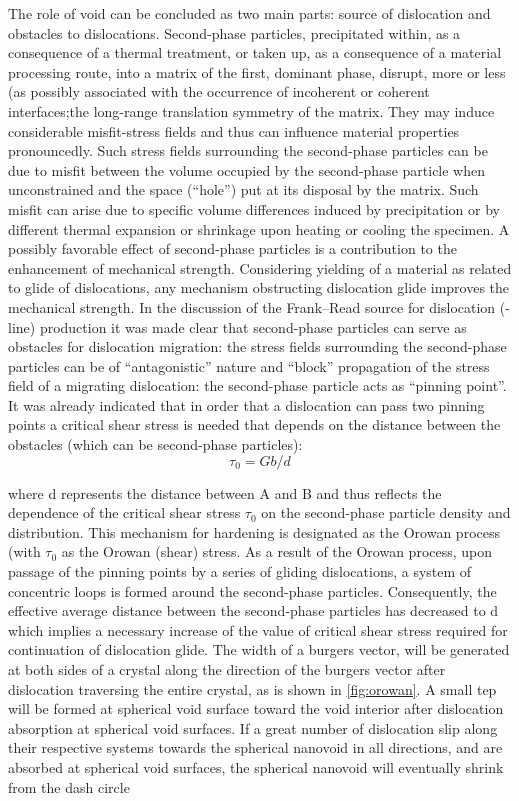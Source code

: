 \documentclass[metals,article,submit,moreauthors,pdftex,10pt,a4paper]{Definitions/mdpi}
\begin{document}
The role of void can be concluded as two main parts: source of dislocation and obstacles to dislocations.  Second-phase particles, precipitated within, as a consequence of a thermal treatment, or taken up, as a consequence of a material processing route, into a matrix of the first, dominant phase, disrupt, more or less (as possibly associated with the occurrence of incoherent or coherent interfaces;the long-range translation symmetry of the matrix. They may induce considerable misfit-stress fields and thus can influence material properties pronouncedly. Such stress fields surrounding the second-phase particles can be due to misfit between the volume occupied by the second-phase particle when unconstrained and the space (“hole”) put at its disposal by the matrix. Such misfit can arise due to specific volume differences induced by precipitation or by different thermal expansion or shrinkage upon heating or cooling the specimen. A possibly favorable effect of second-phase particles is a contribution to the enhancement of mechanical strength. Considering yielding of a material as related to glide of dislocations, any mechanism obstructing dislocation glide improves the mechanical strength. In the discussion of the Frank–Read source for dislocation (-line) production  it was made clear that second-phase particles can serve as obstacles for dislocation migration: the stress fields surrounding the second-phase particles can be of “antagonistic” nature and “block” propagation of the stress field of a migrating dislocation: the second-phase particle acts as “pinning point”. It was already indicated that in order that a dislocation can pass two pinning points a critical shear stress is needed that depends on the distance between the obstacles (which can be second-phase particles):
\begin{equation} \label{eq:orowan} 
\tau_0 = Gb/d
\end{equation}

where d represents the distance between A and B and thus reflects the dependence of the critical shear stress $\tau_0$ on the second-phase particle density and distribution. This mechanism for hardening is designated as the Orowan process (with $\tau_0$ as the Orowan (shear) stress. As a result of the Orowan process, upon passage of the pinning points by a series of gliding dislocations, a system of concentric loops is formed around the second-phase particles. Consequently, the effective average distance between the second-phase particles has decreased to d which implies a necessary increase of the value of critical shear stress required for continuation of dislocation glide. The width of a burgers vector, will be generated at both sides of a crystal along the direction of the burgers vector after dislocation traversing the entire crystal, as is shown in \ref{fig:orowan}. A small tep will be formed at spherical void surface toward the void interior after dislocation absorption at spherical void surfaces. If a great number of dislocation slip along their respective systems towards the spherical nanovoid in all directions, and are absorbed at spherical void surfaces, the spherical nanovoid will eventually shrink from the dash circle 
\end{document}
